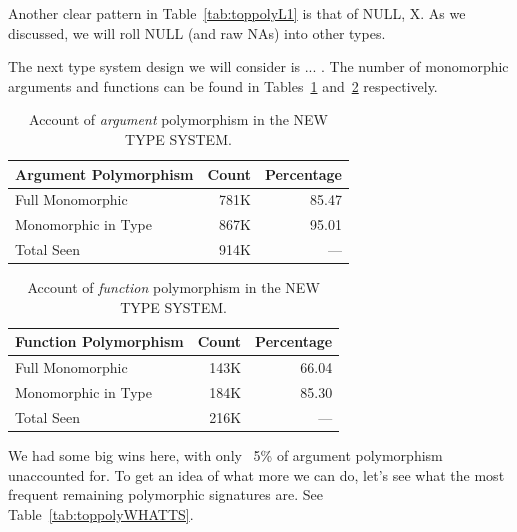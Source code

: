 \documentclass[acmsmall,10pt,review,anonymous]{acmart}\settopmatter{printfolios=true,printccs=false,printacmref=false}
\begin{document}
Another clear pattern in Table~\ref{tab:toppolyL1} is that of NULL, X.
As we discussed, we will roll NULL (and raw NAs) into other types.

The next type system design we will consider is ... .
The number of monomorphic arguments and functions can be found in Tables~\ref{tab:argcountsWHATTS} and~\ref{tab:funcountsWHATTS} respectively.

\begin{table}[ht]
\label{tab:argcountsWHATTS}
\centering
\begin{tabular}{lrr}
  \hline
 Argument Polymorphism & Count & Percentage \\ 
  \hline
  Full Monomorphic & 781K & 85.47 \\
  Monomorphic in Type & 867K & 95.01 \\
  Total Seen & 914K & --- \\ 
     \hline
\end{tabular}
\caption{Account of {\it argument} polymorphism in the NEW TYPE SYSTEM.}
\end{table}

\begin{table}[ht]
\label{tab:funcountsWHATTS}
\centering
\begin{tabular}{lrr}
  \hline
 Function Polymorphism & Count & Percentage \\ 
  \hline
  Full Monomorphic & 143K & 66.04 \\ 
  Monomorphic in Type & 184K & 85.30 \\
  Total Seen & 216K & --- \\ 
   \hline
\end{tabular}
\caption{Account of {\it function} polymorphism in the NEW TYPE SYSTEM.}
\end{table}

We had some big wins here, with only ~5\% of argument polymorphism unaccounted for.
To get an idea of what more we can do, let's see what the most frequent remaining polymorphic signatures are.
See Table~\ref{tab:toppolyWHATTS}.
\end{document}
